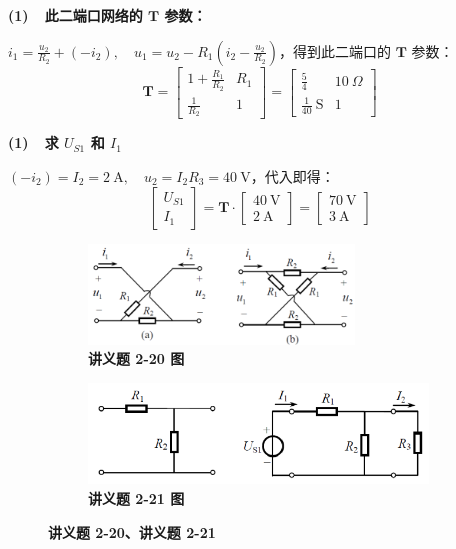 \documentclass[UTF8]{report}
\theoremstyle{MyLineTheoremStyle} %
\theoremstyle{MyBlockTheoremStyle} %
\theoremstyle{MySubsubsectionStyle} %
\begin{document}
\noindent \textbf{(1)\ \ 此二端口网络的 $\boldsymbol{T}$ 参数：}

$i_1 = \frac{u_2}{R_2} + (-i_2),\quad u_1 = u_2 - R_1(i_2 - \frac{u_2}{R_2})$，得到此二端口的 $\boldsymbol{T}$ 参数：
\begin{equation}
\boldsymbol{T} = 
\begin{bmatrix}
    1 + \frac{R_1}{R_2} & R_1 \\ 
    \frac{1}{R_2} & 1
\end{bmatrix}
=
\begin{bmatrix}
    \frac{5}{4} & 10\  \Omega \\ 
    \frac{1}{40} \ \mathrm{S} & 1
\end{bmatrix}
\end{equation}

\noindent \textbf{(1)\ \ 求 $U_{S1}$ 和 $I_1$}

$(-i_2) = I_2 = 2\ \mathrm{A},\quad u_2 = I_2R_3 = 40\ \mathrm{V}$，代入即得：
\begin{equation}
\begin{bmatrix}
    U_{S1} \\ 
    I_1
\end{bmatrix}
= 
\boldsymbol{T}\cdot 
\begin{bmatrix}
    40\ \mathrm{V} \\ 
    2 \ \mathrm{A}
\end{bmatrix}
= 
\begin{bmatrix}
    70\ \mathrm{V} \\ 
    3 \ \mathrm{A}
\end{bmatrix}
\end{equation}

\begin{figure}[H]\centering
\begin{subfigure}[t]{0.4\columnwidth}\centering
    \includegraphics[height=76pt]{assets/4/ffe92b96174b737b0ba9725eef3dd53e.png}
    \caption{\bfseries 讲义题 2-20 图 }
\end{subfigure}\begin{subfigure}[t]{0.6\columnwidth}\centering
    \includegraphics[height=76pt]{assets/4/a3822dcee8e6253ad95a943b6b83e06e.png}
    \caption{\bfseries 讲义题 2-21 图 }
\end{subfigure}
\caption{\bfseries 讲义题 2-20、讲义题 2-21 }\label{求G参数}
\end{figure}
\end{document}
